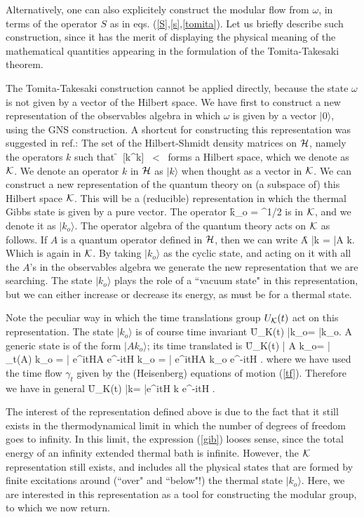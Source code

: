 Alternatively, one can also explicitely construct
the modular flow from $\omega$, in terms of the
operator $S$ as in eqs. (\ref{S},\ref{s},\ref{tomita}).
 Let us briefly describe such
construction, since it has the merit of displaying the physical
meaning of the mathematical quantities appearing in the
formulation of the Tomita-Takesaki theorem.

The Tomita-Takesaki construction cannot be applied directly, because
the state $\omega$ is not given by a vector of the Hilbert space.
We have first to construct a new representation of the
observables algebra in which $\omega$ is given by a vector
$|0\rangle$, using the GNS construction.  A shortcut for
constructing this representation was suggested in ref.\cite{hhw}:
The set of the Hilbert-Shmidt density matrices on $\cal H$,
namely the operators $k$ such that
\f
	\tr\, [k^\star k] \ <\ \infty
\ff
forms a Hilbert space, which we denote as $\cal K$. We denote an
operator $k$ in $\cal H$ as $|k\rangle$ when thought as a vector
in $\cal K$.   We can construct a new representation of the
quantum theory on (a subspace of) this Hilbert space $\cal K$.
This will be a (reducible) representation in which the thermal
Gibbs state is given by a pure vector.   The operator
\f
	k_o = \omega^{1/2}
\ff
is in $\cal K$, and we denote it as $|k_o\rangle$.  The operator
algebra of the quantum theory acts on $\cal K$ as follows. If $A$
is a quantum operator defined in $\cal H$, then we can write
\f
	A |k \rangle = |A k\rangle.
\ff
Which is again in $\cal K$.  By taking $|k_o\rangle$ as the cyclic
state, and acting on it with all the $A$'s in the observables
algebra we generate the new representation that we are
searching.   The state $|k_o\rangle$ plays the role of a ``vacuum
state" in this representation, but we can either increase or
decrease its energy, as must be for a thermal state.

Note the peculiar way in which the time translations group
$U_{\cal K}(t)$ act on this representation.  The state
$|k_o\rangle$ is of course time invariant
\f
	U_{\cal K}(t) |k_o\rangle = |k_o\rangle.
\ff
A generic state is of the form $|A k_o\rangle$; its time
translated is
\f
	U_{\cal K}(t) | A k_o\rangle = | \gamma_t(A) k_o\rangle
	= | e^{itH}A e^{-itH} k_o\rangle
	= | e^{itH}A k_o e^{-itH} \rangle .
\ff
where we have used the time flow $\gamma_t$ given by the
(Heisenberg) equations of motion (\ref{tf}).
Therefore we have in general
\f
	U_{\cal K}(t) |k\rangle = |e^{itH} k e^{-itH} \rangle.
\ff

The interest of the representation defined above is due to the
fact that it still exists in the thermodynamical limit in which the
number of degrees of freedom goes to infinity. In this limit, the
expression (\ref{gib}) looses sense, since the total energy of an
infinity extended thermal bath is infinite. However, the $\cal K$
representation still exists, and includes all the physical states
that are formed by finite excitations around (``over" and ``below"!)
the thermal state $|k_o\rangle$.   Here, we are interested in this
representation as a tool for constructing the modular group, to
which we now return.

